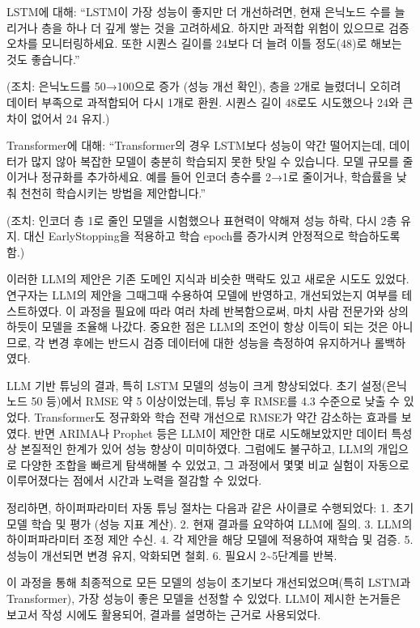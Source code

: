 \documentclass[12pt,ko,a4,]{report}
\begin{document}
LSTM에 대해: ``LSTM이 가장 성능이 좋지만 더 개선하려면, 현재 은닉노드
수를 늘리거나 층을 하나 더 깊게 쌓는 것을 고려하세요. 하지만 과적합
위험이 있으므로 검증 오차를 모니터링하세요. 또한 시퀀스 길이를 24보다 더
늘려 이틀 정도(48)로 해보는 것도 좋습니다.''

(조치: 은닉노드를 50→100으로 증가 (성능 개선 확인), 층을 2개로 늘렸더니
오히려 데이터 부족으로 과적합되어 다시 1개로 환원. 시퀀스 길이 48로도
시도했으나 24와 큰 차이 없어서 24 유지.)

Transformer에 대해: ``Transformer의 경우 LSTM보다 성능이 약간
떨어지는데, 데이터가 많지 않아 복잡한 모델이 충분히 학습되지 못한 탓일
수 있습니다. 모델 규모를 줄이거나 정규화를 추가하세요. 예를 들어 인코더
층수를 2→1로 줄이거나, 학습률을 낮춰 천천히 학습시키는 방법을
제안합니다.''

(조치: 인코더 층 1로 줄인 모델을 시험했으나 표현력이 약해져 성능 하락,
다시 2층 유지. 대신 EarlyStopping을 적용하고 학습 epoch를 증가시켜
안정적으로 학습하도록 함.)

이러한 LLM의 제안은 기존 도메인 지식과 비슷한 맥락도 있고 새로운 시도도
있었다. 연구자는 LLM의 제안을 그때그때 수용하여 모델에 반영하고,
개선되었는지 여부를 테스트하였다. 이 과정을 필요에 따라 여러 차례
반복함으로써, 마치 사람 전문가와 상의하듯이 모델을 조율해 나갔다. 중요한
점은 LLM의 조언이 항상 이득이 되는 것은 아니므로, 각 변경 후에는 반드시
검증 데이터에 대한 성능을 측정하여 유지하거나 롤백하였다.

LLM 기반 튜닝의 결과, 특히 LSTM 모델의 성능이 크게 향상되었다. 초기
설정(은닉노드 50 등)에서 RMSE 약 5 이상이었는데, 튜닝 후 RMSE를 4.3
수준으로 낮출 수 있었다. Transformer도 정규화와 학습 전략 개선으로
RMSE가 약간 감소하는 효과를 보였다. 반면 ARIMA나 Prophet 등은 LLM이
제안한 대로 시도해보았지만 데이터 특성상 본질적인 한계가 있어 성능
향상이 미미하였다. 그럼에도 불구하고, LLM의 개입으로 다양한 조합을
빠르게 탐색해볼 수 있었고, 그 과정에서 몇몇 비교 실험이 자동으로
이루어졌다는 점에서 시간과 노력을 절감할 수 있었다.

정리하면, 하이퍼파라미터 자동 튜닝 절차는 다음과 같은 사이클로
수행되었다: 1. 초기 모델 학습 및 평가 (성능 지표 계산). 2. 현재 결과를
요약하여 LLM에 질의. 3. LLM의 하이퍼파라미터 조정 제안 수신. 4. 각
제안을 해당 모델에 적용하여 재학습 및 검증. 5. 성능이 개선되면 변경
유지, 악화되면 철회. 6. 필요시 2\textasciitilde5단계를 반복.

이 과정을 통해 최종적으로 모든 모델의 성능이 초기보다 개선되었으며(특히
LSTM과 Transformer), 가장 성능이 좋은 모델을 선정할 수 있었다. LLM이
제시한 논거들은 보고서 작성 시에도 활용되어, 결과를 설명하는 근거로
사용되었다.
\end{document}
